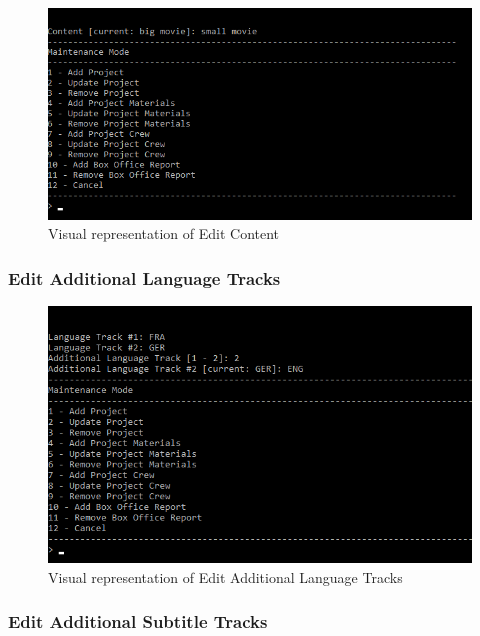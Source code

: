 \documentclass[
  english,
  a4paper,
,tablecaptionabove
]{scrartcl}
\begin{document}
\begin{figure}
\centering
\includegraphics{images/ui-screenshots/update-project-material-content.png}
\caption{Visual representation of Edit Content}
\end{figure}

\newpage

\hypertarget{edit-additional-language-tracks}{%
\subsubsection{Edit Additional Language
Tracks}\label{edit-additional-language-tracks}}

\begin{figure}
\centering
\includegraphics{images/ui-screenshots/update-project-material-additional-language-tracks.png}
\caption{Visual representation of Edit Additional Language Tracks}
\end{figure}

\newpage

\hypertarget{edit-additional-subtitle-tracks}{%
\subsubsection{Edit Additional Subtitle
Tracks}\label{edit-additional-subtitle-tracks}}
\end{document}
